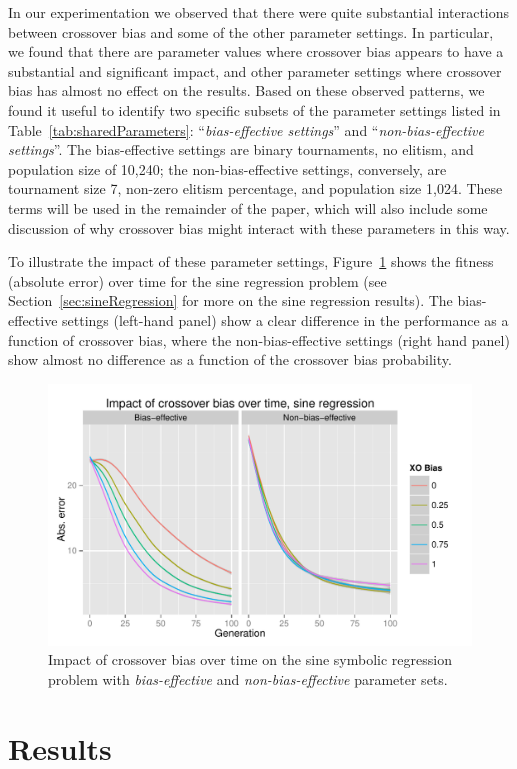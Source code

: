 \documentclass{sig-alternate}
\begin{document}
In our experimentation we observed that
there were quite substantial interactions between crossover bias and some of
the other parameter settings. In particular, we found that there are parameter values where crossover bias appears to
have a substantial and significant impact, and other parameter settings where crossover bias has almost no effect on
the results. Based on these observed patterns, we found it useful to identify two specific subsets of the parameter
settings listed in Table~\ref{tab:sharedParameters}: ``\emph{bias-effective settings}'' and ``\emph{non-bias-effective
settings}''. The bias-effective settings are binary tournaments, no elitism, and population size of 10,240; the
non-bias-effective settings, conversely, are tournament size 7, non-zero elitism percentage, and population size 1,024.
These terms will be used in the remainder of the paper, which will also include some discussion of why crossover bias
might interact with these parameters in this way.

To illustrate the impact of these parameter settings, 
Figure~\ref{fig:sineFitnessVsGenFacets} shows the fitness (absolute error) over time for the sine regression problem
(see Section~\ref{sec:sineRegression} for more on the sine regression results). 
The bias-effective settings (left-hand panel) show a clear difference in the performance as a function of 
crossover bias, where the non-bias-effective settings (right hand panel) show almost no difference as a function of
the crossover bias probability.

\begin{figure}
	\centering
	\includegraphics[width=0.45 \textwidth]{Plots/Sine_fitness_vs_gen_facets.pdf}
	\caption{Impact of crossover bias over time on the sine symbolic regression problem with
		\emph{bias-effective} and \emph{non-bias-effective} parameter sets.}
	\label{fig:sineFitnessVsGenFacets}
\end{figure}

\section{Results} \label{sec:Results}
\end{document}
